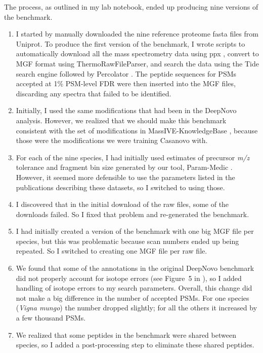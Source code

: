\documentclass{article}
\begin{document}
The process, as outlined in my lab notebook, ended up producing nine versions of the benchmark.
\begin{enumerate}
\item  I started by manually downloaded the nine reference proteome fasta files from Uniprot.
  To produce the first version of the benchmark, I wrote scripts to automatically download all the mass spectrometry data using ppx \cite{fondrie2021ppx}, convert to MGF format using ThermoRawFileParser, and search the data using the Tide search engine \cite{park2008rapid} followed by Percolator \cite{kall2007semi-supervised}.
  The peptide sequences for PSMs accepted at 1\% PSM-level FDR were then inserted into the MGF files, discarding any spectra that failed to be identified.
\item Initially, I used the same modifications that had been in the DeepNovo analysis.  However, we realized that we should make this benchmark consistent with the set of modifications in MassIVE-KnowledgeBase \cite{wang2018assembling}, because those were the modifications we were training Casanovo with.
\item For each of the nine species, I had initially used estimates of precursor \textit{m/z} tolerance and fragment bin size generated by our tool, Param-Medic \cite{may2017param-medic}.
  However, it seemed more defensible to use the parameters listed in the publications describing these datasets, so I switched to using those.
\item I discovered that in the initial download of the raw files, some of the downloads failed.
  So I fixed that problem and re-generated the benchmark.
\item I had initially created a version of the benchmark with one big MGF file per species, but this was problematic because scan numbers ended up being repeated.
  So I switched to creating one MGF file per raw file.
\item We found that some of the annotations in the original DeepNovo benchmark did not properly account for isotope errors (see Figure~5 in \cite{bittremieux2024deep}), so I added handling of isotope errors to my search parameters.
  Overall, this change did not make a big difference in the number of accepted PSMs.
  For one species (\textit{Vigna mungo}) the number dropped slightly; for all the others it increased by a few thousand PSMs. 
\item We realized that some peptides in the benchmark were shared between species, so I added a post-processing step to eliminate these shared peptides.

\end{enumerate}
\end{document}
